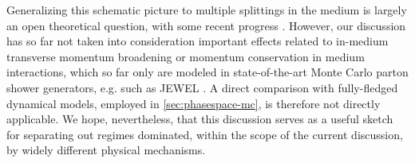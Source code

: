 %
%

Generalizing this schematic picture to multiple splittings in the medium is largely an open theoretical question, with some recent progress \cite{Mehtar-Tani:2017web,Caucal:2018dla}.
However, our discussion has so far not taken into consideration important effects related to in-medium transverse momentum broadening or momentum conservation in medium interactions, which so far only are modeled in state-of-the-art Monte Carlo parton shower generators, e.g. such as JEWEL \cite{Zapp:2011ya,Zapp:2012ak}.
A direct comparison with fully-fledged dynamical models, employed in \autoref{sec:phasespace-mc}, is therefore not directly applicable. We hope, nevertheless, that this discussion serves as a useful sketch for separating out regimes dominated, within the scope of the current discussion, by widely different physical mechanisms.

